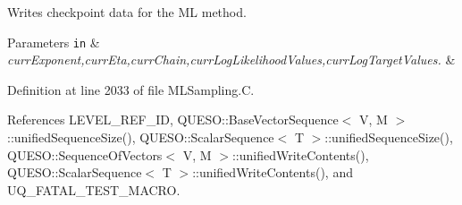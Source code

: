 Writes checkpoint data for the M\-L method. 


\begin{DoxyParams}[1]{Parameters}
\mbox{\tt in}  & {\em curr\-Exponent,curr\-Eta,curr\-Chain,curr\-Log\-Likelihood\-Values,curr\-Log\-Target\-Values.} & \\
\hline
\end{DoxyParams}


Definition at line 2033 of file M\-L\-Sampling.\-C.



References L\-E\-V\-E\-L\-\_\-\-R\-E\-F\-\_\-\-I\-D, Q\-U\-E\-S\-O\-::\-Base\-Vector\-Sequence$<$ V, M $>$\-::unified\-Sequence\-Size(), Q\-U\-E\-S\-O\-::\-Scalar\-Sequence$<$ T $>$\-::unified\-Sequence\-Size(), Q\-U\-E\-S\-O\-::\-Sequence\-Of\-Vectors$<$ V, M $>$\-::unified\-Write\-Contents(), Q\-U\-E\-S\-O\-::\-Scalar\-Sequence$<$ T $>$\-::unified\-Write\-Contents(), and U\-Q\-\_\-\-F\-A\-T\-A\-L\-\_\-\-T\-E\-S\-T\-\_\-\-M\-A\-C\-R\-O.


